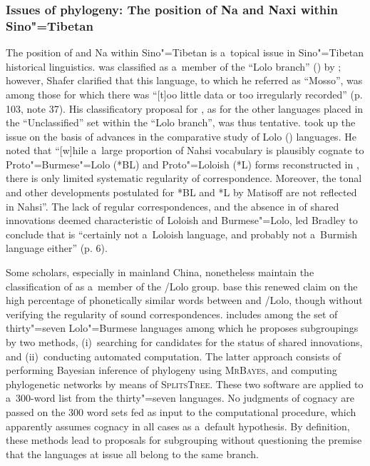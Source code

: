 \subsubsection{Issues of phylogeny: The position of Na and Naxi within Sino"=Tibetan}
\label{sec:thepositionofnaandnaxiwithinsinotibetan}

The position of  and Na within Sino"=Tibetan is a~topical issue in Sino"=Tibetan historical
linguistics.  was classified as a~member of the “Lolo branch” () by \citet{Shafer1955};
however, Shafer clarified that this language, to which he referred as “Mosso”, was among those for
which there was “[t]oo little data or too irregularly recorded” (p. 103, note 37). His classificatory
proposal for , as for the other languages placed in the “Unclassified” set within the “Lolo
branch”, was thus tentative. \citet{Bradley1975} took up the issue on the basis of advances in the
comparative study of Lolo () languages. He noted that “[w]hile a~large proportion of Nahsi
vocabulary is plausibly cognate to Proto"={Burmese}"=Lolo (*BL) and Proto"=Loloish (*L) forms
reconstructed in \citealt{Bradley1975b}, there is only limited systematic regularity of
correspondence. Moreover, the tonal and other developments postulated for *BL and *L by Matisoff are
not reflected in Nahsi”. The lack of regular correspondences, and the absence in  of shared
innovations deemed characteristic of Loloish and Burmese"=Lolo, led Bradley to conclude that  is
“certainly not a~Loloish language, and probably not a~Burmish language either” (p. 6).

Some scholars, especially in mainland China, nonetheless maintain the classification of  as
a~member of the /{\allowbreak}Lolo group. \citet{gaietal1990} base this renewed claim on the high
percentage of phonetically similar words between  and /{\allowbreak}Lolo, though without
verifying the regularity of sound correspondences. \citet{Lama2012} includes  among the set of
thirty"=seven Lolo"={Burmese} languages among which he proposes subgroupings by two methods, (i)~searching for
candidates for the status of shared innovations, and (ii)~conducting automated computation. The latter approach consists of performing Bayesian inference of phylogeny using \textsc{MrBayes}, and computing phylogenetic networks by means of  \textsc{SplitsTree}. These two software are applied to a~300-word list from the thirty"=seven languages. No judgments of cognacy
are passed on the 300 word sets fed as input to the computational procedure, which apparently
assumes cognacy in all cases as a~default hypothesis. By definition, these methods lead to proposals
for subgrouping without questioning the premise that the languages at issue all belong to the same
branch.

